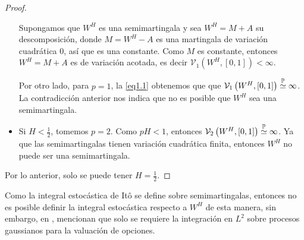 \documentclass[letterpaper,12pt,oneside]{book}
\theoremstyle{plain}
\numberwithin{theorem}{section}
\begin{document}
\begin{proof}
\begin{itemize}
		Supongamos que $W^H$ es una semimartingala y sea $W^H=M+A$ su descomposición, donde $M=W^H-A$ es una martingala de variación cuadrática $0$, así que es una constante. Como $M$ es constante, entonces $W^H=M+A$ es de variación acotada, es decir $\mathcal V_1\left(W^H,[0,1]\right)<\infty$.
		
		Por otro lado, para $p=1$, la \cref{eq1.1} obtenemos que que $\mathcal V_1\left(W^H,[0,1]\right)\buildrel\mathbb P \over\simeq\infty$. %
		La contradicción anterior nos indica que no es posible que $W^H$ sea una semimartingala.
		
		\item Si $H<\frac{1}{2}$, tomemos $p=2$. Como $pH<1$, entonces $\mathcal V_2\left(W^H,[0,1]\right)\buildrel\mathbb P \over\simeq\infty$. %
		Ya que las semimartingalas tienen variación cuadrática finita, entonces $W^H$ no puede ser una semimartingala.
	\end{itemize}
	Por lo anterior, solo se puede tener $H=\frac{1}{2}$.
\end{proof}
Como la integral estocástica de Itô se define sobre semimartingalas, entonces no es posible definir la integral estocástica respecto a $W^H$ de esta manera,  sin embargo, en \cite{comte_long_1996}, mencionan que solo se requiere la integración en $L^2$ sobre procesos gaussianos para la valuación de opciones.
\end{document}
